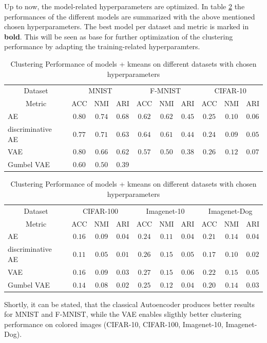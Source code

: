 \documentclass[12pt,DIV14,BCOR12mm,a4paper,footexclude,headinclude,halfparskip-,twoside,openright,cleardoubleempty,idxtotoc,bibtotoc,listtotoc]{scrreprt} %
\numberwithin{equation}{chapter}
\begin{document}
Up to now, the model-related hyperparameters are optimized. In table \ref{tab:ClusterPerformance_Models_ModelrelatedParams} the performances of the different models are summarized with the above mentioned chosen hyperparameters. The best model per dataset and metric is marked in \textbf{bold}. This will be seen as base for further optimization of the clustering performance by adapting the training-related hyperparamters.
	\begin{table}[htb!]
    		\centering
    		\caption{Clustering Performance of models + kmeans on different datasets with chosen hyperparameters}
    		\label{tab:ClusterPerformance_Models_ModelrelatedParams}
    		\begin{tabular}{l|ccccccccc}
    			\toprule
    			\multicolumn{1}{c}{Dataset} & \multicolumn{3}{c}{MNIST} & \multicolumn{3}{c}{F-MNIST} & \multicolumn{3}{c}{CIFAR-10}\\
        		\multicolumn{1}{c}{Metric} & ACC & NMI & ARI & ACC & NMI & ARI & ACC & NMI & ARI\\
        		\midrule
    			AE & $\mathbf{0.80}$ & $\mathbf{0.74}$ & $\mathbf{0.68}$ & $0.62$ & $\mathbf{0.62}$ & $\mathbf{0.45}$ & $0.25$ & $0.10$ & $0.06$\\
        		discriminative AE & $0.77$ & $0.71$ & $0.63$ & $\mathbf{0.64}$ & $0.61$ & $0.44$ & $0.24$ & $0.09$ & $0.05$\\
        		VAE & $\mathbf{0.80}$ & $0.66$ & $0.62$ & $0.57$ & $0.50$ & $0.38$ & $\mathbf{0.26}$ & $\mathbf{0.12}$ & $\mathbf{0.07}$\\
        		Gumbel VAE & $0.60$ & $0.50$ & $0.39$\\
        		\bottomrule
    		\end{tabular}    		
    		\begin{tabular}{l|ccccccccc}
    			\toprule
    			\multicolumn{1}{c}{Dataset} & \multicolumn{3}{c}{CIFAR-100} & \multicolumn{3}{c}{Imagenet-10} & \multicolumn{3}{c}{Imagenet-Dog}\\
        		\multicolumn{1}{c}{Metric} & ACC & NMI & ARI & ACC & NMI & ARI & ACC & NMI & ARI\\
        		\midrule
    			AE & $\mathbf{0.16}$ & $\mathbf{0.09}$ & $\mathbf{0.04}$ & $0.24$ & $0.11$ & $0.04$ & $0.21$ & $0.14$ & $0.04$\\
        		discriminative AE & $0.11$ & $0.05$ & $0.01$ & $0.26$ & $\mathbf{0.15}$ & $0.05$ & $0.17$ & $0.10$ & $0.02$\\
        		VAE & $\mathbf{0.16}$ & $\mathbf{0.09}$ & $0.03$ & $\mathbf{0.27}$ & $\mathbf{0.15}$ & $\mathbf{0.06}$ & $\mathbf{0.22}$ & $\mathbf{0.15}$ & $\mathbf{0.05}$\\
        		Gumbel VAE & $0.14$ & $0.08$ & $0.02$ & $0.25$ & $0.12$ & $0.04$ & $0.20$ & $0.14$ & $0.03$\\
        		\bottomrule
    		\end{tabular}
	\end{table}
	Shortly, it can be stated, that the classical Autoencoder produces better results for MNIST and F-MNIST, while the VAE enables sligthly better clustering performance on colored images (CIFAR-10, CIFAR-100, Imagenet-10, Imagenet-Dog).
\end{document}
